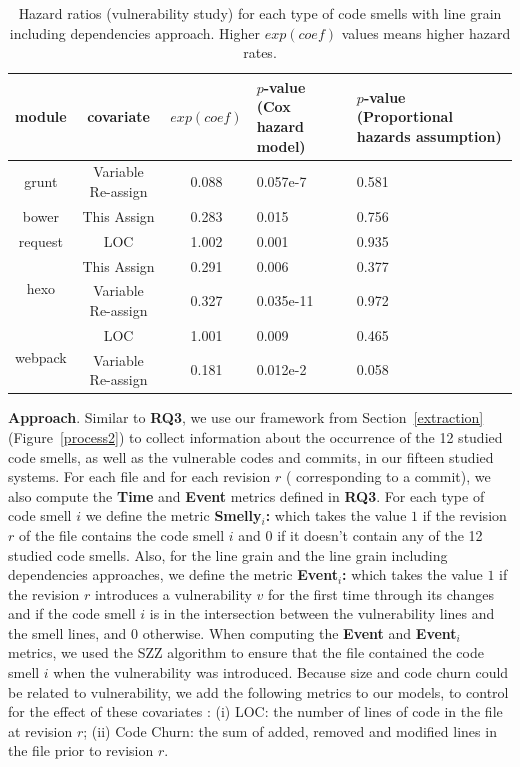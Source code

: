 {\begin{table}[t]
\end{table}

\begin{table}[t]
	\centering
	\scriptsize
	\caption{Hazard ratios (vulnerability study) for each type of code smells with line grain including dependencies approach. Higher $exp(coef)$ values means higher hazard rates.}
	\begin{tabular}{c|c|c|p{1.1cm}|p{1.3cm}}
		\hline
		module & covariate & $exp(coef)$ & $p$-value (Cox hazard model) & $p$-value (Proportional hazards assumption) \\ \hline
		\multirow{1}{*}{grunt} 
		& Variable Re-assign & 0.088 & 0.057e-7 & 0.581 \\ \hline
		\multirow{1}{*}{bower}
		& This Assign & 0.283 & 0.015 & 0.756 \\ \hline
		\multirow{1}{*}{request}
		& LOC & 1.002 & 0.001 & 0.935 \\ \hline
		\multirow{2}{*}{hexo}
		& This Assign & 0.291 & 0.006 & 0.377 \\ \cline{2-5}
		& Variable Re-assign & 0.327 & 0.035e-11 & 0.972 \\ \hline
		\multirow{2}{*}{webpack}
		& LOC & 1.001 & 0.009 & 0.465 \\ \cline{2-5}
		& Variable Re-assign & 0.181 & 0.012e-2 & 0.058 \\ \hline
	\end{tabular}
	\label{smelltypes6}

\end{table}

\textbf{Approach}. Similar to \textbf{RQ3}, we use our framework from Section~\ref{extraction} (Figure~\ref{process2}) to collect information about the occurrence of the 12 studied code smells, as well as the vulnerable codes and commits, in our fifteen studied systems. For each file and for each revision $r$ (\ie{} corresponding to a commit), we also compute the \textbf{Time} and \textbf{Event} metrics defined in \textbf{RQ3}. For each type of code smell $i$ we define the metric \textbf{Smelly$_{i}$:} which takes the value $1$ if the revision $r$ of the file contains the code smell $i$ and $0$ if it doesn't contain any of the 12 studied code smells. Also, for the line grain and the line grain including dependencies approaches, we define the metric \textbf{Event$_{i}$:} which takes the value $1$ if the revision $r$ introduces a vulnerability $v$ for the first time through its changes and if the code smell $i$ is in the intersection between the vulnerability lines and the smell lines, and $0$ otherwise. When computing the \textbf{Event} and \textbf{Event$_{i}$} metrics, we used the SZZ algorithm to ensure that the file contained the code smell $i$ when the vulnerability was introduced.
Because size and code churn could be related to vulnerability, we add the following metrics to our models, to control for the effect of these covariates : (i) LOC: the number of lines of code in the file at revision $r$; (ii) Code Churn: the sum of added, removed and modified lines in the file prior to revision $r$.

}

